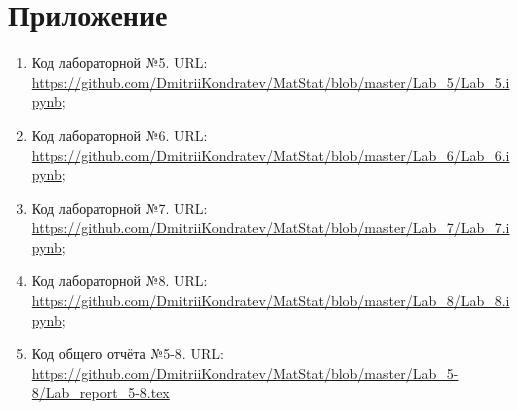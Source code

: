 \documentclass[12pt,a4paper]{article}
\begin{document}
\section{Приложение}
	\begin{enumerate}
		\item Код лабораторной №5. URL: \url{https://github.com/DmitriiKondratev/MatStat/blob/master/Lab_5/Lab_5.ipynb};
		
		\item Код лабораторной №6. URL: \url{https://github.com/DmitriiKondratev/MatStat/blob/master/Lab_6/Lab_6.ipynb};
		
		\item Код лабораторной №7. URL: \url{https://github.com/DmitriiKondratev/MatStat/blob/master/Lab_7/Lab_7.ipynb};
		
		\item Код лабораторной №8. URL: \url{https://github.com/DmitriiKondratev/MatStat/blob/master/Lab_8/Lab_8.ipynb};
		
		\item Код общего отчёта №5-8. URL: \url{https://github.com/DmitriiKondratev/MatStat/blob/master/Lab_5-8/Lab_report_5-8.tex}	
	\end{enumerate}
\end{document}
